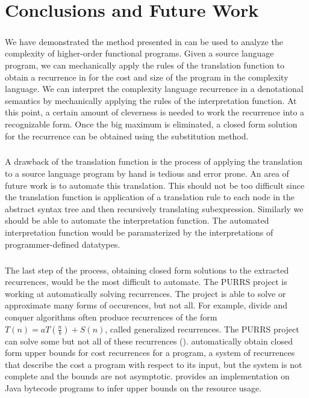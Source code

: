 \chapter{Conclusions and Future Work}

\paragraph{}
We have demonstrated the method presented in \citet{Danner2015} can be used to
analyze the complexity of higher-order functional programs. Given a source
language program, we can mechanically apply the rules of the translation
function to obtain a recurrence in for the cost and size of the program in the
complexity language. We can interpret the complexity language recurrence in a
denotational semantics by mechanically applying the rules of the interpretation
function. At this point, a certain amount of cleverness is needed to work the
recurrence into a recognizable form. Once the big maximum is eliminated, a
closed form solution for the recurrence can be obtained using the substitution
method.

\paragraph{}
A drawback of the translation function is the process of applying the
translation to a source language program by hand is tedious and error prone. An
area of future work is to automate this translation. This should not be too
difficult since the translation function is application of a translation rule
to each node in the abstract syntax tree and then recursively translating
subexpression. Similarly we should be able to automate the interpretation
function. The automated interpretation function would be paramaterized by the
interpretations of programmer-defined datatypes.

\paragraph{}
The last step of the process, obtaining closed form solutions to the extracted
recurrences, would be the most difficult to automate. The PURRS project is
working at automatically solving recurrences. The project
is able to solve or approximate many forms of occurences, but not all. For
example, divide and conquer algorithms often produce recurrences of the form
$T(n) = a T(\frac{n}{b}) + S(n)$, called generalized recurrences. The PURRS
project can solve some but not all of these recurrences (\citet{Bagnara2003}).
\citet{Albert2011} automatically obtain closed form upper bounds for cost
recurrences for a program, a system of recurrences that describe the cost a
program with respect to its input, but the system is not complete and the
bounds are not asymptotic. \citet{Albert2013} provides an implementation on
Java bytecode programs to infer upper bounds on the resource usage.


